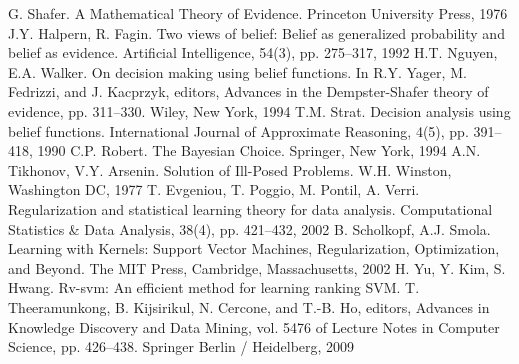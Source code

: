 \documentclass[12pt,a4paper,oneside]{article}
\begin{document}
\begin{thebibliography}{9}
	 G. Shafer. A Mathematical Theory of Evidence. Princeton University Press, 1976%
	 J.Y. Halpern, R. Fagin. Two views of belief: Belief as generalized probability and belief as evidence. Artificial Intelligence, 54(3), pp. 275–317, 1992%
	 H.T. Nguyen,  E.A. Walker. On decision making using belief functions. In R.Y. Yager, M. Fedrizzi, and J. Kacprzyk, editors, Advances in the Dempster-Shafer theory of evidence, pp. 311–330. Wiley, New York, 1994%
	 T.M. Strat. Decision analysis using belief functions. International Journal of Approximate Reasoning, 4(5), pp. 391–418, 1990%
	 C.P. Robert. The Bayesian Choice. Springer, New York, 1994%
	 A.N. Tikhonov, V.Y. Arsenin. Solution of Ill-Posed Problems. W.H. Winston, Washington DC, 1977%
	 T. Evgeniou, T. Poggio, M. Pontil, A. Verri. Regularization and statistical learning theory for data analysis. Computational Statistics \& Data Analysis, 38(4), pp. 421–432, 2002%
	 B. Scholkopf, A.J. Smola. Learning with Kernels: Support Vector Machines, Regularization, Optimization, and Beyond. The MIT Press, Cambridge, Massachusetts, 2002%
	 H. Yu, Y. Kim, S. Hwang. Rv-svm: An efficient method for learning ranking SVM. T. Theeramunkong, B. Kijsirikul, N. Cercone, and T.-B. Ho, editors, Advances in Knowledge Discovery and Data Mining, vol. 5476 of Lecture Notes in Computer Science, pp. 426–438. Springer Berlin / Heidelberg, 2009%
\end{thebibliography}
\end{document}
